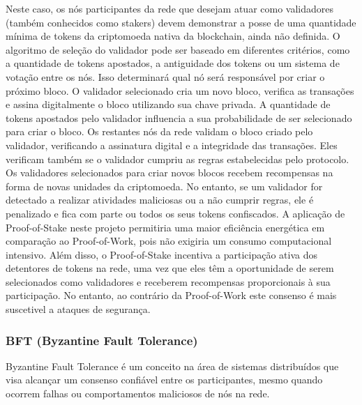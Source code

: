 \documentclass[conference]{IEEEtran}
\begin{document}
    Neste caso, os nós participantes da rede que desejam atuar como validadores (também conhecidos como stakers) devem demonstrar a posse de uma quantidade mínima de tokens da criptomoeda nativa da blockchain, ainda não definida.
    O algoritmo de seleção do validador pode ser baseado em diferentes critérios, como a quantidade de tokens apostados, a antiguidade dos tokens ou um sistema de votação entre os nós. Isso determinará qual nó será responsável por criar o próximo bloco.
    O validador selecionado cria um novo bloco, verifica as transações e assina digitalmente o bloco utilizando sua chave privada. A quantidade de tokens apostados pelo validador influencia a sua probabilidade de ser selecionado para criar o bloco.
    Os restantes nós da rede validam o bloco criado pelo validador, verificando a assinatura digital e a integridade das transações. Eles verificam também se o validador cumpriu as regras estabelecidas pelo protocolo.
    Os validadores selecionados para criar novos blocos recebem recompensas na forma de novas unidades da criptomoeda. No entanto, se um validador for detectado a realizar atividades maliciosas ou a não cumprir regras, ele é penalizado e fica com parte ou todos os seus tokens confiscados.
    A aplicação de Proof-of-Stake neste projeto permitiria uma maior eficiência energética em comparação ao Proof-of-Work, pois não exigiria um consumo computacional intensivo. Além disso, o Proof-of-Stake incentiva a participação ativa dos detentores de tokens na rede, uma vez que eles têm a oportunidade de serem selecionados como validadores e receberem recompensas proporcionais à sua participação. No entanto, ao contrário da Proof-of-Work este consenso é mais suscetivel a ataques de segurança.

    \subsubsection{BFT (Byzantine Fault Tolerance)}
    Byzantine Fault Tolerance é um conceito na área de sistemas distribuídos que visa alcançar um consenso confiável entre os participantes, mesmo quando ocorrem falhas ou comportamentos maliciosos de nós na rede.
\end{document}
